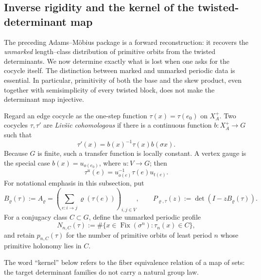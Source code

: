 \subsection{Inverse rigidity and the kernel of the twisted-determinant map}
\label{subsec:inverse-rigidity}

The preceding Adams--M\"obius package is a forward reconstruction: it
recovers the \emph{unmarked} length--class distribution of primitive orbits
from the twisted determinants.  We now determine exactly what is lost when
one asks for the cocycle itself.  The distinction between marked and unmarked
periodic data is essential.  In particular, primitivity of both the base and
the skew product, even together with semisimplicity of every twisted block,
does not make the determinant map injective.

Regard an edge cocycle as the one-step function
\(\tau(x)=\tau(e_0)\) on \(X_A^+\).  Two cocycles \(\tau,\tau'\) are
\emph{Liv\v{s}ic cohomologous} if there is a continuous function
\(b:X_A^+\to G\) such that
\begin{equation}\label{eq:livsic-cohomology}
  \tau'(x)=b(x)^{-1}\tau(x)b(\sigma x).
\end{equation}
Because \(G\) is finite, such a transfer function is locally constant.  A
vertex gauge is the special case \(b(x)=u_{o(e_0)}\), where \(u:V\to G\);
then
\begin{equation}\label{eq:vertex-gauge}
  \tau^u(e)=u_{o(e)}^{-1}\tau(e)u_{t(e)}.
\end{equation}
For notational emphasis in this subsection, put
\[
  B_\varrho(\tau):=A_\varrho
  =\left(\sum_{e:i\to j}\varrho(\tau(e))\right)_{i,j\in V},
  \qquad
  P_{\varrho,\tau}(z):=\det(I-zB_\varrho(\tau)).
\]
For a conjugacy class \(C\subset G\), define the unmarked periodic profile
\begin{equation}\label{eq:unmarked-periodic-profile}
  N_{n,C}(\tau)
  :=\#\{x\in\operatorname{Fix}(\sigma^n):\tau_n(x)\in C\},
\end{equation}
and retain \(p_{n,C}(\tau)\) for the number of primitive orbits of least
period \(n\) whose primitive holonomy lies in \(C\).

The word ``kernel'' below refers to the fiber equivalence relation of a map
of sets: the target determinant families do not carry a natural group law.

